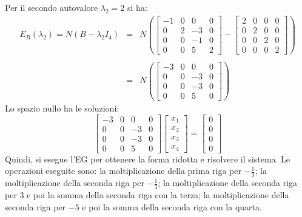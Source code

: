 \documentclass[a4paper]{article}
\begin{document}
	\noindent
	Per il secondo autovalore $\lambda_{2} = 2$ si ha:
	\begin{equation*}
		\begin{array}{lll}
			E_{B}\left(\lambda_{2}\right) = N\left(B - \lambda_{2}I_{4}\right) & = & N\left(
			\begin{bmatrix}
				-1 & 0 & 0 & 0 	\\
				0 & 2 & -3 & 0 	\\
				0 & 0 & -1 & 0 	\\
				0 & 0 & 5 & 2
			\end{bmatrix} - \begin{bmatrix}
				2 & 0 & 0 & 0 	\\
				0 & 2 & 0 & 0 	\\
				0 & 0 & 2 & 0 	\\
				0 & 0 & 0 & 2
			\end{bmatrix}\right) \\
			\\
			& = & N\left(
			\begin{bmatrix}
				-3 & 0 & 0 & 0 	\\
				0 & 0 & -3 & 0 	\\
				0 & 0 & -3 & 0 	\\
				0 & 0 & 5 & 0
			\end{bmatrix}\right)
		\end{array}
	\end{equation*}
	Lo spazio nullo ha le soluzioni:
	\begin{equation*}
		\begin{bmatrix}
			-3 & 0 & 0 & 0 	\\
			0 & 0 & -3 & 0 	\\
			0 & 0 & -3 & 0 	\\
			0 & 0 & 5 & 0
		\end{bmatrix} \begin{bmatrix}
			x_{1} \\
			x_{2} \\
			x_{3} \\
			x_{4}
		\end{bmatrix} = \begin{bmatrix}
			0 \\
			0 \\
			0 \\
			0
		\end{bmatrix}
	\end{equation*}
	Quindi, si esegue l'EG per ottenere la forma ridotta e risolvere il sistema. Le operazioni eseguite sono: la moltiplicazione della prima riga per $-\frac{1}{3}$; la moltiplicazione della seconda riga per $-\frac{1}{3}$; la moltiplicazione della seconda riga per $3$ e poi la somma della seconda riga con la terza; la moltiplicazione della seconda riga per $-5$ e poi la somma della seconda riga con la quarta.
\end{document}
